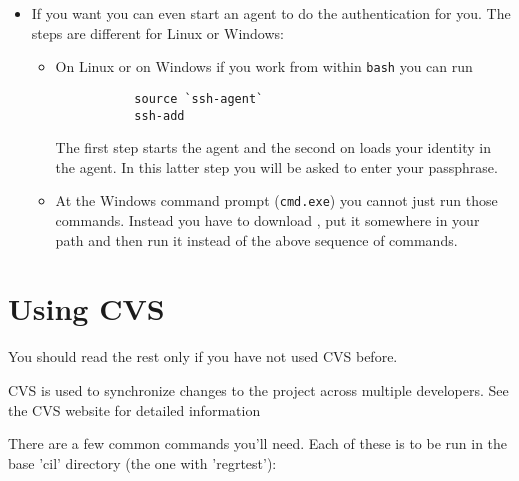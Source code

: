 \documentclass{article}
\def\t#1{{\tt #1}}
\begin{document}
\begin{itemize}
\item If you want you can even start an agent to do the authentication for
you. The steps are different for Linux or Windows:
   \begin{itemize}
     \item On Linux or on Windows if you work from within \t{bash} you can run
        \begin{verbatim} 
           source `ssh-agent`
           ssh-add
        \end{verbatim}

       The first step starts the agent and the second on loads your identity
       in the agent. In this latter step you will be asked to enter your
       passphrase. 
     \item At the Windows command prompt (\t{cmd.exe}) you cannot just run
       those commands. Instead you have to download
       ,  
       put it somewhere in your path and then run it instead of the above
       sequence of commands. 
   \end{itemize}

\end{itemize}

\section{Using CVS}

 You should read the rest only if you have not used CVS before. 

 CVS is used to synchronize changes to the project across multiple
developers.  See the CVS website for detailed information

  
There are a few common commands you'll need.  Each of these is to be run
in the base 'cil' directory (the one with 'regrtest'):
\end{document}
